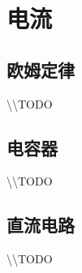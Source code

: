 
\section{电流}

\subsection{欧姆定律}

\textbackslash\textbackslash TODO

\subsection{电容器}

\textbackslash\textbackslash TODO

\subsection{直流电路}

\textbackslash\textbackslash TODO
